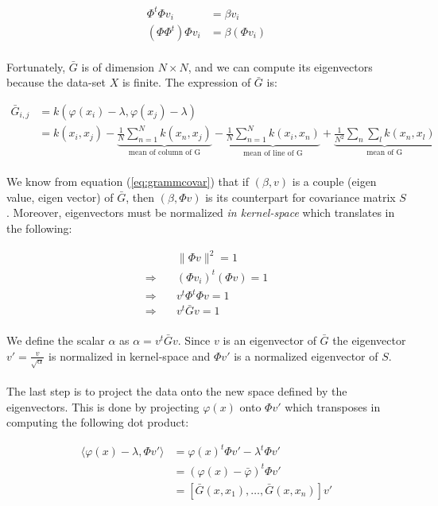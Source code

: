 \begin{align}\label{eq:grammcovar}
\Phi^t\Phi v_i &= \beta v_i \\
(\Phi\Phi^t)\Phi v_i &= \beta (\Phi v_i)
\end{align}

\paragraph{} Fortunately, $\bar{G}$ is of dimension $N \times N$, and we can compute its
eigenvectors because the data-set $X$ is finite. The expression of $\bar{G}$ is:

\begin{align*}
\bar{G}_{i, j} &= k(\varphi(x_i) - \lambda, \varphi(x_j) - \lambda) \\
&= k(x_i, x_j) - \underbrace{\frac{1}{N}\sum_{n = 1}^N k(x_n, x_j)}_{\text{mean of column of G}} - \underbrace{\frac{1}{N}\sum_{n = 1}^N k(x_i, x_n)}_{\text{mean of line of G}} + \underbrace{\frac{1}{N^2}\sum_n\sum_l k(x_n, x_l)}_{\text{mean of G}}
\end{align*}

\paragraph{} We know from equation (\ref{eq:grammcovar}) that if $(\beta, v)$ is a couple (eigen
value, eigen vector) of $\bar{G}$, then $(\beta, \Phi v)$ is its counterpart for covariance matrix
$S$. Moreover, eigenvectors must be normalized \emph{in kernel-space} which translates in the
following:

\begin{align*}
&\| \Phi v \|^2 = 1 \\
\Rightarrow\quad &(\Phi v_i)^t(\Phi v) = 1 \\
\Rightarrow\quad &v^t\Phi^t\Phi v = 1 \\
\Rightarrow\quad &v^t \bar{G} v = 1
\end{align*}

\paragraph{} We define the scalar $\alpha$ as $\alpha = v^t \bar{G} v$. Since $v$ is an eigenvector
of $\bar{G}$ the eigenvector $v' = \frac{v}{\sqrt{\alpha}}$ is normalized in kernel-space and $\Phi
v'$ is a normalized eigenvector of $S$.


\paragraph{} The last step is to project the data onto the new space defined by the eigenvectors.
This is done by projecting $\varphi(x)$ onto $\Phi v'$ which transposes in computing the following
dot product:

\begin{align*}
\langle\varphi(x) - \lambda, \Phi v'\rangle &= \varphi(x)^t\Phi v' - \lambda^t\Phi v' \\
&= (\varphi(x) - \bar{\varphi})^t\Phi v' \\
&= [\bar{G}(x, x_1), \ldots, \bar{G}(x, x_n)] v'
\end{align*}

